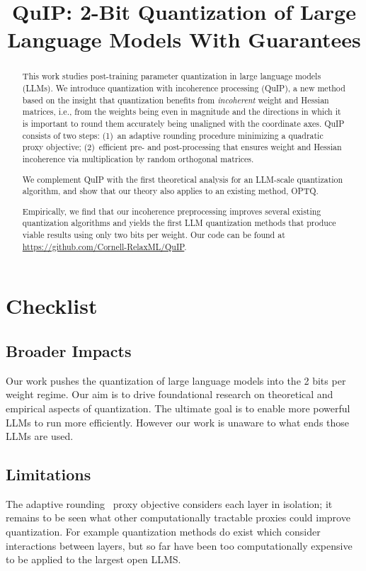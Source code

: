 \title{QuIP: 2-Bit Quantization of Large Language Models With Guarantees}

\begin{abstract}
This work studies post-training parameter quantization in large language models (LLMs). We introduce quantization with incoherence processing (QuIP), a new method based on the insight that quantization benefits from {\em incoherent} weight and Hessian matrices, i.e., from the weights being even in magnitude and the directions in which it is important to round them accurately being unaligned with the coordinate axes. QuIP consists of two steps: (1)~an adaptive rounding procedure minimizing a quadratic proxy objective; (2)~efficient pre- and post-processing that ensures weight and Hessian incoherence via multiplication by random orthogonal matrices.

We complement QuIP with the first theoretical analysis for an LLM-scale quantization algorithm, and show that our theory also applies to an existing method, OPTQ.

Empirically, we find that our incoherence preprocessing improves several existing quantization algorithms and yields the first LLM quantization methods that produce viable results using only two bits per weight. Our code can be found at \url{https://github.com/Cornell-RelaxML/QuIP}.
\end{abstract}

\section{Checklist}

\subsection{Broader Impacts} Our work pushes the quantization of large language models into the 2 bits per weight regime. Our aim is to drive foundational research on theoretical and empirical aspects of quantization. The ultimate goal is to enable more powerful LLMs to run more efficiently. However our work is unaware to what ends those LLMs are used.

\subsection{Limitations}
The adaptive rounding~\cite{nagel2020up} proxy objective considers each layer in isolation; it remains to be seen what other computationally tractable proxies could improve quantization. For example quantization methods do exist which consider interactions between layers, but so far have been too computationally expensive to be applied to the largest open LLMS.

